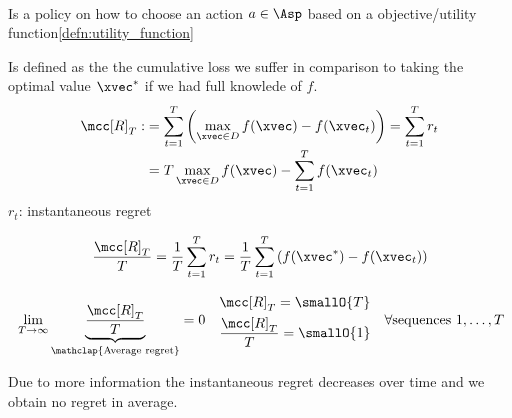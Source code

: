 \begin{defnbox}\nospacing
  \begin{defn}\label{defn:optimizing_agent_decision_maker}\leavevmode\\
    Is a policy on how to choose an action $a\in\Asp$ based on a objective/utility function\cref{defn:utility_function}
  \end{defn}
\end{defnbox}
\begin{defnbox}\nospacing
  \begin{defn}\label{defn:cumulative_regret}
    Is defined as the the cumulative loss we suffer in comparison to taking
    the optimal value $\xvec^*$ if we had full knowlede of $f$.
    \begin{align}
      \mcc[R]_T:&=\sum_{t=1}^{T}\left(\max_{\xvec\in D}f(\xvec)-f(\xvec_t)\right)=\sum_{t=1}^{T}r_t\nonumber\\[-1\jot]
      &=T\max_{\xvec\in D}f(\xvec)-\sum_{t=1}^{T}f(\xvec_t)
    \end{align}
    $r_{t}$: instantaneous regret
  \end{defn}
\end{defnbox}
\begin{defnbox}\nospacing
  \begin{defn}\label{defn:average_regret}
    \begin{align}
      \frac{\mcc[R]_T}{T}=\frac{1}{T}\sum_{t=1}^{T}r_t=\frac{1}{T}\sum_{t=1}^{T}\left(f(\xvec^*)-f(\xvec_t)\right)
    \end{align}
  \end{defn}
\end{defnbox}
\begin{defnbox}\nospacing
  \begin{defn}
    \begin{align}
      &\lim_{T\to\infty}\underbrace{\frac{\mcc[R]_T}{T}}_{\mathclap{\text{Average regret}}}=0
      &&\begin{aligned}
          &\mcc[R]_T=\smallO{T}\\
          &\frac{\mcc[R]_T}{T}=\smallO{1}
         \end{aligned}&\forall \text{sequences }1,\ldots,T
    \end{align}
  \end{defn}
\end{defnbox}
\begin{explanationbox}
  \begin{explanation}
    Due to more information the instantaneous regret decreases over time and
    we obtain no regret in average.
  \end{explanation}
\end{explanationbox}
